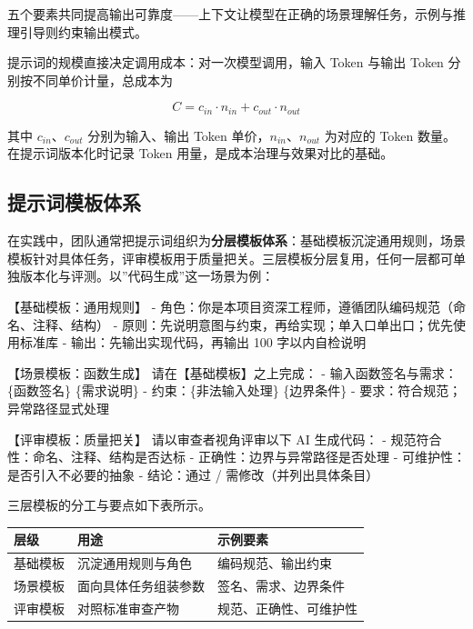 \documentclass[12pt,a4paper,twoside,openany]{ctexbook}
\numberwithin{figure}{chapter}
\numberwithin{table}{chapter}
\newenvironment{Shaded}{}{}
\newcommand{\NormalTok}[1]{#1}
\newcounter{none}
\begin{document}
五个要素共同提高输出可靠度------上下文让模型在正确的场景理解任务，示例与推理引导则约束输出模式。

提示词的规模直接决定调用成本：对一次模型调用，输入 Token 与输出 Token
分别按不同单价计量，总成本为

\[C=c_{in}\cdot n_{in}+c_{out}\cdot n_{out}\]

其中 \(c_{in}\)、\(c_{out}\) 分别为输入、输出 Token
单价，\(n_{in}\)、\(n_{out}\) 为对应的 Token 数量。在提示词版本化时记录
Token 用量，是成本治理与效果对比的基础。

\subsection{提示词模板体系}\label{ux63d0ux793aux8bcdux6a21ux677fux4f53ux7cfb}

在实践中，团队通常把提示词组织为\textbf{分层模板体系}：基础模板沉淀通用规则，场景模板针对具体任务，评审模板用于质量把关。三层模板分层复用，任何一层都可单独版本化与评测。以''代码生成''这一场景为例：

\begin{Shaded}
\begin{Highlighting}[]
\NormalTok{【基础模板：通用规则】}
\NormalTok{{-} 角色：你是本项目资深工程师，遵循团队编码规范（命名、注释、结构）}
\NormalTok{{-} 原则：先说明意图与约束，再给实现；单入口单出口；优先使用标准库}
\NormalTok{{-} 输出：先输出实现代码，再输出 100 字以内自检说明}

\NormalTok{【场景模板：函数生成】}
\NormalTok{请在【基础模板】之上完成：}
\NormalTok{{-} 输入函数签名与需求：\{函数签名\} \{需求说明\}}
\NormalTok{{-} 约束：\{非法输入处理\} \{边界条件\}}
\NormalTok{{-} 要求：符合规范；异常路径显式处理}

\NormalTok{【评审模板：质量把关】}
\NormalTok{请以审查者视角评审以下 AI 生成代码：}
\NormalTok{{-} 规范符合性：命名、注释、结构是否达标}
\NormalTok{{-} 正确性：边界与异常路径是否处理}
\NormalTok{{-} 可维护性：是否引入不必要的抽象}
\NormalTok{{-} 结论：通过 / 需修改（并列出具体条目）}
\end{Highlighting}
\end{Shaded}

三层模板的分工与要点如下表所示。

{\def\LTcaptype{none} %
\begin{longtable}[]{@{}lll@{}}
\toprule\noalign{}
层级 & 用途 & 示例要素 \\
\midrule\noalign{}
\endhead
\bottomrule\noalign{}
\endlastfoot
基础模板 & 沉淀通用规则与角色 & 编码规范、输出约束 \\
场景模板 & 面向具体任务组装参数 & 签名、需求、边界条件 \\
评审模板 & 对照标准审查产物 & 规范、正确性、可维护性 \\
\end{longtable}
}
\end{document}
